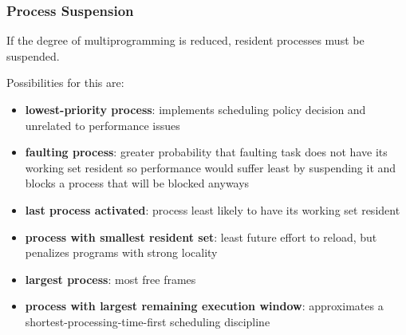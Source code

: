 \documentclass[11pt]{article}
\begin{document}
\subsubsection{Process Suspension}
\label{sec:org0243796}
If the degree of multiprogramming is reduced, resident processes must be suspended.

Possibilities for this are:
\begin{itemize}
\item \textbf{lowest-priority process}: implements scheduling policy decision and unrelated
to performance issues
\item \textbf{faulting process}: greater probability that faulting task does not have its
working set resident so performance would suffer least by suspending it and
blocks a process that will be blocked anyways
\item \textbf{last process activated}: process least likely to have its working set resident
\item \textbf{process with smallest resident set}: least future effort to reload, but
penalizes programs with strong locality
\item \textbf{largest process}: most free frames
\item \textbf{process with largest remaining execution window}: approximates a
shortest-processing-time-first scheduling discipline
\end{itemize}
\end{document}
